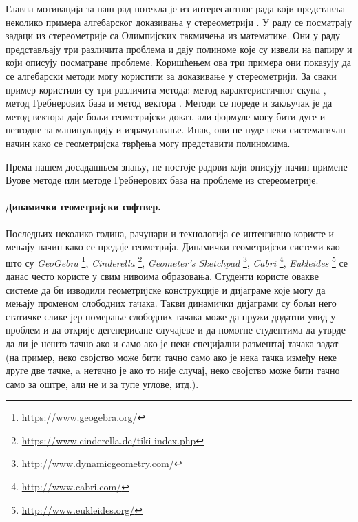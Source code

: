 Главна мотивација за наш рад потекла је из интересантног рада који
представља неколико примера алгебарског доказивања у стереометрији
\cite{shao2016challenging}. У раду се посматрају задаци из
стереометрије са Олимпијских такмичења из математике. Они у раду
представљају три различита проблема и дају полиноме које су извели на
папиру и који описују посматране проблеме. Коришћењем ова три примера
они показују да се алгебарски методи могу користити за доказивање у
стереометрији. За сваки пример користили су три различита метода:
метод карактеристичног скупа \cite{wu2007mathematics,
  wang1998decomposing, gao1991computations, chen2002projection}, метод
Гребнерових база \cite{cox1992ideals, kutzler1986application,
  stifter1993geometry, chou1987characteristic} и метод вектора
\cite{lord1985method}. Методи се пореде и закључак је да метод вектора
даје бољи геометријски доказ, али формуле могу бити дуге и незгодне за
манипулацију и израчунавање. Ипак, они не нуде неки систематичан начин
како се геометријска тврђења могу представити полиномима.

Према нашем досадашњем знању, не постоје радови који описују начин
примене Вуове методе или методе Гребнерових база на проблеме из
стереометрије.

\paragraph{Динамички геометријски софтвер.}
Последњих неколико година, рачунари и технологија се интензивно користе
и мењају начин како се предаје геометрија.  Динамички геометријски
системи као што су \emph{GeoGebra}
 \footnote{\url{https://www.geogebra.org/}},
 \emph{Cinderella} \footnote{\url{https://www.cinderella.de/tiki-index.php}},
 \emph{Geometer's
   Sketchpad} \footnote{\url{http://www.dynamicgeometry.com/}},
 \emph{Cabri} \footnote{\url{http://www.cabri.com/}},
 \emph{Eukleides} \footnote{\url{http://www.eukleides.org/}} се данас
 често користе у свим нивоима образовања. Студенти користе овакве
 системе да би изводили геометријске конструкције и дијаграме које
 могу да мењају променом слободних тачака. Такви динамички дијаграми
 су бољи него статичке слике јер померање слободних тачака може да
 пружи додатни увид у проблем и да открије дегенерисане случајеве и
 да помогне студентима да утврде да ли је нешто тачно ако и само ако
 је неки специјални размештај тачака задат (на пример, неко својство
 може бити тачно само ако је нека тачка између неке друге две тачке, a
 нетачно је ако то није случај, неко својство може бити тачно само за
 оштре, али не и за тупе углове, итд.).

